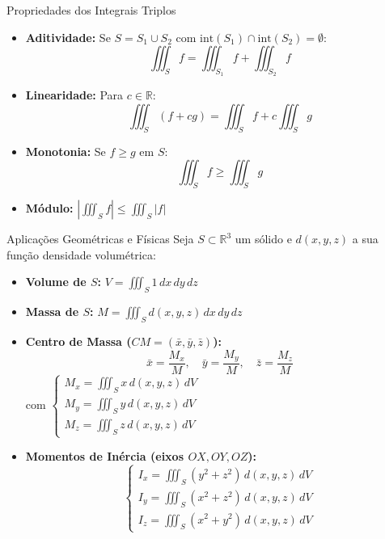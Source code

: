 \documentclass[11pt,a4paper]{article}
\newcommand{\R}{\mathbb{R}}
\begin{document}
\noindent\begin{minipage}[t]{0.49\textwidth}
  \begin{theorembox}{Propriedades dos Integrais Triplos}
    \begin{itemize}
      \item \textbf{Aditividade:} Se $S = S_1 \cup S_2$ com $\text{int}(S_1) \cap \text{int}(S_2) = \emptyset$:
        \[ \iiint_S f = \iiint_{S_1} f + \iiint_{S_2} f \]
      \item \textbf{Linearidade:} Para $c \in \R$:
        \[ \iiint_S (f + cg) = \iiint_S f + c \iiint_S g \]
      \item \textbf{Monotonia:} Se $f \ge g$ em $S$:
        \[ \iiint_S f \ge \iiint_S g \]
      \item \textbf{Módulo:} $\left| \iiint_S f \right| \le \iiint_S |f|$
    \end{itemize}
  \end{theorembox}
\end{minipage}\hfill
\begin{minipage}[t]{0.49\textwidth}
  \begin{formulabox}{Aplicações Geométricas e Físicas}
    Seja $S \subset \R^3$ um sólido e $d(x,y,z)$ a sua função densidade volumétrica:
    \begin{itemize}
      \item \textbf{Volume de $S$:} $V = \iiint_S 1 \, dx \, dy \, dz$
      \item \textbf{Massa de $S$:} $M = \iiint_S d(x, y, z) \, dx \, dy \, dz$
      \item \textbf{Centro de Massa ($CM = (\bar{x}, \bar{y}, \bar{z})$):}
        \[ \bar{x} = \frac{M_x}{M}, \quad \bar{y} = \frac{M_y}{M}, \quad \bar{z} = \frac{M_z}{M} \]
        com $\begin{cases} M_x = \iiint_S x \, d(x,y,z) \, dV \\ M_y = \iiint_S y \, d(x,y,z) \, dV \\ M_z = \iiint_S z \, d(x,y,z) \, dV \end{cases}$
      \item \textbf{Momentos de Inércia (eixos $OX, OY, OZ$):}
        \[ \begin{cases} I_x = \iiint_S (y^2+z^2) \, d(x,y,z) \, dV \\ I_y = \iiint_S (x^2+z^2) \, d(x,y,z) \, dV \\ I_z = \iiint_S (x^2+y^2) \, d(x,y,z) \, dV \end{cases} \]
    \end{itemize}
  \end{formulabox}
\end{minipage}
\end{document}
